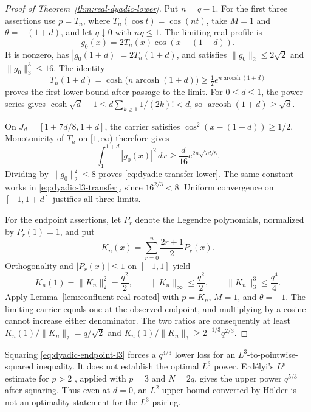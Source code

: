 \begin{proof}[Proof of Theorem~\ref{thm:real-dyadic-lower}]
Put $n=q-1$. For the first three assertions use $p=T_n$, where
$T_n(\cos t)=\cos(nt)$, take $M=1$ and $\theta=-(1+d)$, and let
$\eta\downarrow0$ with $n\eta\le1$. The limiting real profile is
\[
 g_0(x)=2T_n(x)\cos(x-(1+d)).
\]
It is nonzero, has $|g_0(1+d)|=2T_n(1+d)$, and satisfies
$\|g_0\|_2\le2\sqrt2$ and $\|g_0\|_3^3\le16$.
The identity
\[
 T_n(1+d)=\cosh\big(n\operatorname{arcosh}(1+d)\big)
 \ge\tfrac12 e^{n\operatorname{arcosh}(1+d)}
\]
proves the first lower bound after passage to the limit.
For $0\le d\le1$, the power series gives
$\cosh\sqrt d-1\le d\sum_{k\ge1}1/(2k)!<d$, so
$\operatorname{arcosh}(1+d)\ge\sqrt d$.

On $J_d=[1+7d/8,1+d]$, the carrier satisfies
$\cos^2(x-(1+d))\ge1/2$. Monotonicity of $T_n$ on $[1,\infty)$
therefore gives
\[
 \int_1^{1+d}|g_0(x)|^2\,dx
 \ge\frac d{16}e^{2n\sqrt{7d/8}}.
\]
Dividing by $\|g_0\|_2^2\le8$ proves
\eqref{eq:dyadic-transfer-lower}. The same constant works in
\eqref{eq:dyadic-l3-transfer}, since $16^{2/3}<8$.
Uniform convergence on $[-1,1+d]$ justifies all three limits.

For the endpoint assertions, let $P_r$ denote the Legendre polynomials,
normalized by $P_r(1)=1$, and put
\begin{equation}\label{eq:legendre-endpoint-kernel}
 K_n(x)=\sum_{r=0}^n\frac{2r+1}{2}P_r(x).
\end{equation}
Orthogonality and $|P_r(x)|\le1$ on $[-1,1]$ yield
\[
 K_n(1)=\|K_n\|_2^2=\frac{q^2}{2},\qquad
 \|K_n\|_\infty\le\frac{q^2}{2},\qquad
 \|K_n\|_3^3\le\frac{q^4}{4}.
\]
Apply Lemma~\ref{lem:confluent-real-rooted} with $p=K_n$, $M=1$,
and $\theta=-1$. The limiting carrier equals one at the observed
endpoint, and multiplying by a cosine cannot increase either denominator.
The two ratios are consequently at least
$K_n(1)/\|K_n\|_2=q/\sqrt2$ and
$K_n(1)/\|K_n\|_3\ge2^{-1/3}q^{2/3}$.
\end{proof}

\begin{remark}
Squaring \eqref{eq:dyadic-endpoint-l3} forces a $q^{4/3}$ lower loss
for an $L^3$-to-pointwise-squared inequality. It does not establish the
optimal $L^3$ power. Erd\'elyi's $L^p$ estimate for $p>2$
\cite[Theorem 2.10 in the arXiv version]{Erdelyi2017}, applied with
$p=3$ and $N=2q$, gives the upper power $q^{5/3}$ after squaring.
Thus even at $d=0$, an $L^2$ upper bound converted by H\"older is not an
optimality statement for the $L^3$ pairing.
\end{remark}

